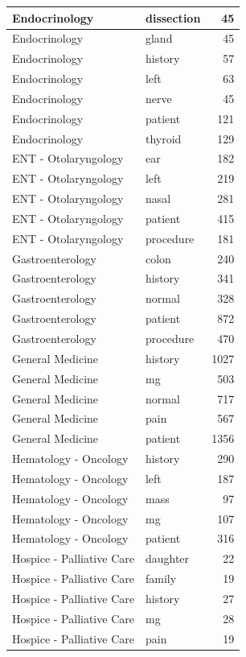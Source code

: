 \documentclass[
]{article}
\begin{document}
\begin{table}
\begin{tabular}{l|l|r}
\hline
Endocrinology & dissection & 45\\
\hline
Endocrinology & gland & 45\\
\hline
Endocrinology & history & 57\\
\hline
Endocrinology & left & 63\\
\hline
Endocrinology & nerve & 45\\
\hline
Endocrinology & patient & 121\\
\hline
Endocrinology & thyroid & 129\\
\hline
ENT - Otolaryngology & ear & 182\\
\hline
ENT - Otolaryngology & left & 219\\
\hline
ENT - Otolaryngology & nasal & 281\\
\hline
ENT - Otolaryngology & patient & 415\\
\hline
ENT - Otolaryngology & procedure & 181\\
\hline
Gastroenterology & colon & 240\\
\hline
Gastroenterology & history & 341\\
\hline
Gastroenterology & normal & 328\\
\hline
Gastroenterology & patient & 872\\
\hline
Gastroenterology & procedure & 470\\
\hline
General Medicine & history & 1027\\
\hline
General Medicine & mg & 503\\
\hline
General Medicine & normal & 717\\
\hline
General Medicine & pain & 567\\
\hline
General Medicine & patient & 1356\\
\hline
Hematology - Oncology & history & 290\\
\hline
Hematology - Oncology & left & 187\\
\hline
Hematology - Oncology & mass & 97\\
\hline
Hematology - Oncology & mg & 107\\
\hline
Hematology - Oncology & patient & 316\\
\hline
Hospice - Palliative Care & daughter & 22\\
\hline
Hospice - Palliative Care & family & 19\\
\hline
Hospice - Palliative Care & history & 27\\
\hline
Hospice - Palliative Care & mg & 28\\
\hline
Hospice - Palliative Care & pain & 19\\

\end{tabular}
\end{table}
\end{document}
